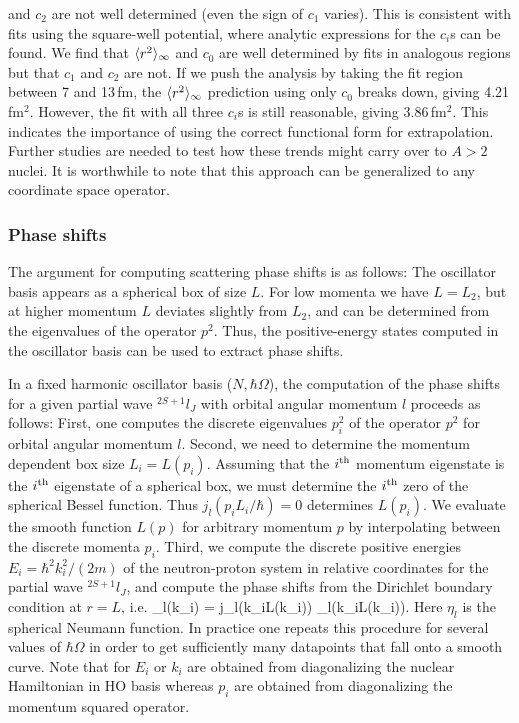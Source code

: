 	and $c_2$ are not well determined (even the sign of $c_1$
	varies).  This is consistent with
	fits using the square-well potential, where analytic expressions
	for the $c_i$s can be found.  We find that $\langle r^2 \rangle_{\infty}$
	and $c_0$ are well determined by fits in analogous
	regions but that $c_1$ and $c_2$ are not.
	If we push the analysis by taking the fit region between 7 and 13\,fm,
	the $\langle r^2 \rangle_{\infty}$ prediction using only $c_0$ breaks down, giving
	4.21\,fm$^2$.  However, the fit with all three $c_i$s is still
	reasonable, giving 3.86\,fm$^2$.  This indicates the importance of using
	the correct functional form for extrapolation.
	Further studies are needed to test how these trends might carry
	over to $A>2$ nuclei.  It is worthwhile to note that this approach can
	be generalized to any coordinate space operator.

	\medskip
	\subsubsection{Phase shifts}

	The argument for computing scattering phase shifts is as
	follows: The oscillator basis appears as a spherical box of size
	$L$.  For low momenta we have $L=L_2$, but at higher momentum $L$
	deviates slightly from $L_2$, and can be determined from the
	eigenvalues of the operator $p^2$.  Thus, the positive-energy states
	computed in the oscillator basis can be used to extract phase shifts.

	In a fixed harmonic oscillator basis ($N,\hbar\Omega$), the
	computation of the phase shifts for a given partial wave $^{2S+1}l_J$
	with orbital angular momentum $l$ proceeds as follows: First, one
	computes the discrete eigenvalues $p_i^2$ of the operator $p^2$ for
	orbital angular momentum $l$.  Second, we need to determine the
	momentum dependent box size $L_i=L(p_i)$.  Assuming that the $i^{\rm th}$
	momentum eigenstate is the $i^{\rm th}$ eigenstate of a
	spherical box, we must determine the $i^{\rm th}$ zero of the
	spherical Bessel function.  Thus $j_l(p_iL_i/\hbar) = 0 $ determines
	$L(p_i)$.  We evaluate the smooth function $ L(p)$ for arbitrary
	momentum $p$ by interpolating between the discrete momenta
	$p_i$.  Third, we compute the discrete positive energies $E_i =
	\hbar^2k_i^2/(2m)$ of the neutron-proton system in relative
	coordinates for the partial wave $^{2S+1}l_J$, and compute the phase
	shifts from the Dirichlet boundary condition at $r=L$, i.e.
	\beq
	\tan\delta_l(k_i) = { j_l(k_iL(\hbar k_i)) \over \eta_l(k_iL(\hbar k_i))}\;.
	\eeq
	Here $\eta_l$ is the spherical Neumann function.  In practice one
	repeats this procedure for several values of $\hbar\Omega$ in order to
	get sufficiently many datapoints that fall onto a smooth curve.
	Note that for $E_i$ or $k_i$ are obtained from diagonalizing the nuclear
	Hamiltonian in HO basis whereas $p_i$ are obtained from diagonalizing the
	momentum squared operator.

